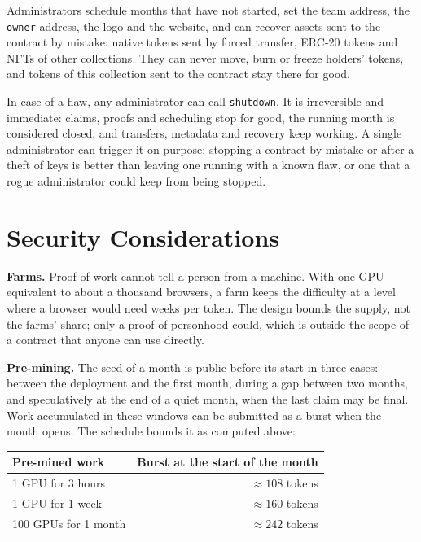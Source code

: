 \documentclass[10pt,letterpaper]{article}
\newcommand{\fn}[1]{\texttt{#1}}
\begin{document}
Administrators schedule months that have not started, set the team address, the \fn{owner} address, the logo and
the website, and can recover assets sent to the contract by mistake: native tokens sent by forced transfer, ERC-20
tokens and NFTs of other collections. They can never move, burn or freeze holders' tokens, and tokens of this
collection sent to the contract stay there for good.

In case of a flaw, any administrator can call \fn{shutdown}. It is irreversible and immediate: claims, proofs and
scheduling stop for good, the running month is considered closed, and transfers, metadata and recovery keep
working. A single administrator can trigger it on purpose: stopping a contract by mistake or after a theft of keys
is better than leaving one running with a known flaw, or one that a rogue administrator could keep from being
stopped.

\section{Security Considerations}\label{sec:security}

\textbf{Farms.} Proof of work cannot tell a person from a machine. With one GPU equivalent to about a thousand
browsers, a farm keeps the difficulty at a level where a browser would need weeks per token. The design bounds the
supply, not the farms' share; only a proof of personhood could, which is outside the scope of a contract that
anyone can use directly.

\textbf{Pre-mining.} The seed of a month is public before its start in three cases: between the deployment and the
first month, during a gap between two months, and speculatively at the end of a quiet month, when the last claim
may be final. Work accumulated in these windows can be submitted as a burst when the month opens. The schedule
bounds it as computed above:

\begin{center}
\begin{tabular}{lr}
\toprule
Pre-mined work & Burst at the start of the month \\
\midrule
1 GPU for 3 hours & $\approx 108$ tokens \\
1 GPU for 1 week & $\approx 160$ tokens \\
100 GPUs for 1 month & $\approx 242$ tokens \\
\bottomrule
\end{tabular}
\end{center}
\end{document}
